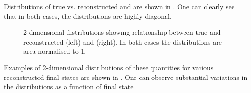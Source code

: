 Distributions of true vs. reconstructed \evis and \pvis are shown in .
One can clearly see that in both cases, the distributions are highly diagonal.

\begin{figure}[h]
	\begin{minipage}[t]{.5\linewidth}
		\begin{adjustbox}{max totalsize=\linewidth, center}
			
		\end{adjustbox}	
	\end{minipage}
	\hfill
	\begin{minipage}[t]{.5\linewidth}
		\begin{adjustbox}{max totalsize=\linewidth, center}
			
		\end{adjustbox}
	\end{minipage}
	\caption[True vs. reconstructed \evis (left) and \pvis (right)]{2-dimensional distributions showing relationship between true and reconstructed \evis (left) and \pvis (right). In both cases the distributions are area normalised to 1.}
	\label{fig:visibleTrueReco}
\end{figure}

Examples of 2-dimensional distributions of these quantities for various reconstructed final states are shown in .
One can observe substantial variations in the distributions as a function of final state.

